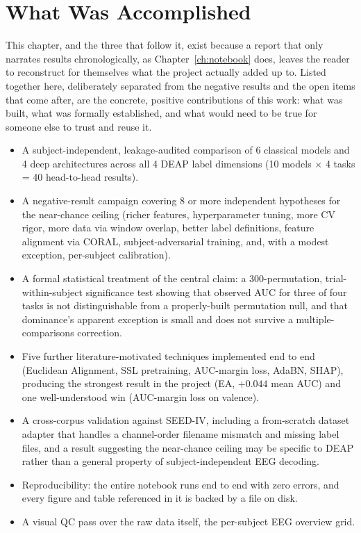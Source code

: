 \documentclass[11pt]{report}
\begin{document}
\chapter{What Was Accomplished}
\label{ch:done}

This chapter, and the three that follow it, exist because a report that only
narrates results chronologically, as Chapter~\ref{ch:notebook} does, leaves
the reader to reconstruct for themselves what the project actually added up
to. Listed together here, deliberately separated from the negative results
and the open items that come after, are the concrete, positive
contributions of this work: what was built, what was formally established,
and what would need to be true for someone else to trust and reuse it.

\begin{itemize}
  \item A subject-independent, leakage-audited comparison of 6 classical
        models and 4 deep architectures across all 4 DEAP label dimensions
        (10 models $\times$ 4 tasks = 40 head-to-head results).
  \item A negative-result campaign covering 8 or more independent
        hypotheses for the near-chance ceiling (richer features,
        hyperparameter tuning, more CV rigor, more data via window overlap,
        better label definitions, feature alignment via CORAL,
        subject-adversarial training, and, with a modest exception,
        per-subject calibration).
  \item A formal statistical treatment of the central claim: a
        300-permutation, trial-within-subject significance test showing that
        observed AUC for three of four tasks is not distinguishable from a
        properly-built permutation null, and that dominance's apparent
        exception is small and does not survive a multiple-comparisons
        correction.
  \item Five further literature-motivated techniques implemented end to end
        (Euclidean Alignment, SSL pretraining, AUC-margin loss, AdaBN, SHAP),
        producing the strongest result in the project (EA, $+0.044$ mean
        AUC) and one well-understood win (AUC-margin loss on valence).
  \item A cross-corpus validation against SEED-IV, including a
        from-scratch dataset adapter that handles a channel-order filename
        mismatch and missing label files, and a result suggesting the
        near-chance ceiling may be specific to DEAP rather than a general
        property of subject-independent EEG decoding.
  \item Reproducibility: the entire notebook runs end to end with zero
        errors, and every figure and table referenced in it is backed by a
        file on disk.
  \item A visual QC pass over the raw data itself, the per-subject EEG
        overview grid.
\end{itemize}
\end{document}
